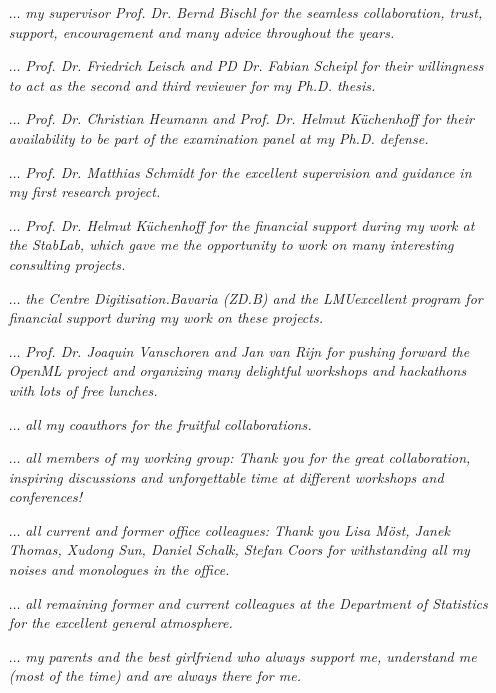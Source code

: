 \documentclass[bibliography=totoc,11pt,BCOR=12mm,DIV=14,twoside,parskip=half,paper=A4,pagesize=auto]{scrbook}\usepackage[]{graphicx}\usepackage{xcolor}
\begin{document}
\begin{itemize}
\item[$\dots$] \textit{my supervisor Prof. Dr. Bernd Bischl for the seamless collaboration, trust, support, encouragement and many advice throughout the years.}
\item[$\dots$] \textit{Prof. Dr. Friedrich Leisch and PD Dr. Fabian Scheipl for their willingness to act as the second and third reviewer for my Ph.D. thesis.}
\item[$\dots$] \textit{Prof. Dr. Christian Heumann and Prof. Dr. Helmut Küchenhoff for their availability to be part of the examination panel at my Ph.D. defense.}
\item[$\dots$] \textit{Prof. Dr. Matthias Schmidt for the excellent supervision and guidance in my first research project.}
\item[$\dots$] \textit{Prof. Dr. Helmut Küchenhoff for the financial support during my work at the StabLab, which gave me the opportunity to work on many interesting consulting projects.}
\item[$\dots$] \textit{the Centre Digitisation.Bavaria (ZD.B) and the LMUexcellent program for financial support during my work on these projects.}
\item[$\dots$] \textit{Prof. Dr. Joaquin Vanschoren and Jan van Rijn for pushing forward the OpenML project and organizing many delightful workshops and hackathons with lots of free lunches.}
\item[$\dots$] \textit{all my coauthors for the fruitful collaborations.}
\item[$\dots$] \textit{all members of my working group: Thank you for the great collaboration, inspiring discussions and unforgettable time at different workshops and conferences!}
\item[$\dots$] \textit{all current and former office colleagues: Thank you Lisa Möst, Janek Thomas, Xudong Sun, Daniel Schalk, Stefan Coors for withstanding all my noises and monologues in the office.}
\item[$\dots$] \textit{all remaining former and current colleagues at the Department of Statistics for the excellent general atmosphere.}
\item[$\dots$] \textit{my parents and the best girlfriend who always support me, understand me (most of the time) and are always there for me.}
\end{itemize}
\newpage

\cleardoublepage

\end{document}
